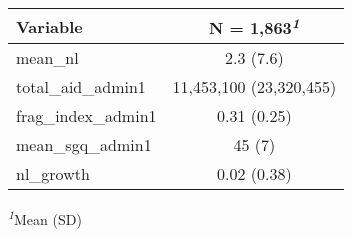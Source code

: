 \begin{table}[!t]
\fontsize{12.0pt}{14.4pt}\selectfont
\begin{tabular*}{\linewidth}{@{\extracolsep{\fill}}lc}
\toprule
\textbf{Variable} & \textbf{N = 1,863}\textsuperscript{\textit{1}} \\ 
\midrule\addlinespace[2.5pt]
mean\_nl & 2.3 (7.6) \\ 
total\_aid\_admin1 & 11,453,100 (23,320,455) \\ 
frag\_index\_admin1 & 0.31 (0.25) \\ 
mean\_sgq\_admin1 & 45 (7) \\ 
nl\_growth & 0.02 (0.38) \\ 
\bottomrule
\end{tabular*}
\begin{minipage}{\linewidth}
\textsuperscript{\textit{1}}Mean (SD)\\
\end{minipage}
\end{table}

